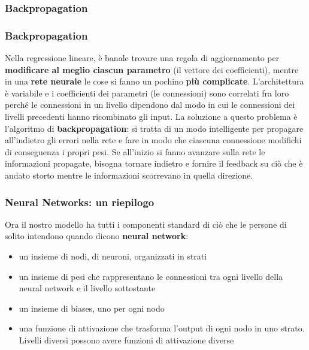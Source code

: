 \subsubsection[Backpropagation]{Backpropagation}
\begin{frame}

	\frametitle{Backpropagation}

	Nella regressione lineare, è banale trovare una regola di aggiornamento per \textbf{modificare al meglio ciascun parametro} (il vettore dei coefficienti), mentre in una \textbf{rete neurale} le cose si fanno un pochino \textbf{più complicate}.
	\newlinedouble
	L'architettura è variabile e i coefficienti dei parametri (le connessioni) sono correlati fra loro perché le connessioni in un livello dipendono dal modo in cui le connessioni dei livelli precedenti hanno ricombinato gli input.
	\newlinedouble
	La soluzione a questo problema è l'algoritmo di \textbf{backpropagation}: si tratta di un modo intelligente per propagare all'indietro gli errori nella rete e fare in modo che ciascuna connessione modifichi di conseguenza i propri pesi. Se all'inizio si fanno avanzare sulla rete le informazioni propagate, bisogna tornare indietro e fornire il feedback su ciò che è andato storto mentre le informazioni scorrevano in quella direzione.
\end{frame}


\begin{frame}

	\frametitle{Neural Networks: un riepilogo}

	Ora il nostro modello ha tutti i componenti standard di ciò che le persone di solito intendono quando dicono \textbf{neural network}:
	\begin{itemize}
		\item un insieme di nodi, di neuroni, organizzati in strati
		\item un insieme di pesi che rappresentano le connessioni tra ogni livello della neural network e il livello sottostante
		\item un insieme di biases, uno per ogni nodo
		\item una funzione di attivazione che trasforma l'output di ogni nodo in uno strato. Livelli diversi possono avere funzioni di attivazione diverse
	\end{itemize}
	
%
%
%

\end{frame}



